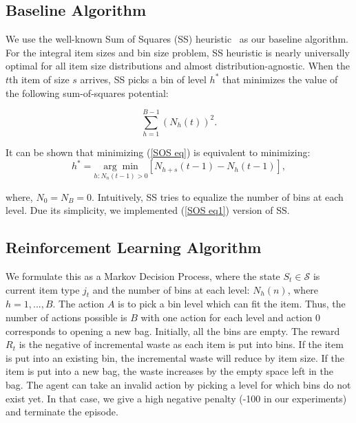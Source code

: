 \documentclass{article}
\begin{document}

\subsection{Baseline Algorithm}
We use the well-known Sum of Squares (SS) heuristic~\cite{csirik2006sum} as our baseline algorithm. For the integral item sizes and bin size problem, SS heuristic is nearly universally optimal for all item size distributions and almost distribution-agnostic. When the $t$th item of size $s$ arrives, SS picks a bin of level $h^*$ that minimizes the value of the following sum-of-squares potential:

\begin{equation}
\sum_{h=1}^{B-1} (N_{h}(t))^2. \label{SOS eq}
\end{equation}

\noindent It can be shown that minimizing (\ref{SOS eq}) is equivalent to minimizing:
\begin{equation}
h^* = \underset{h:N_n(t-1)>0}{\arg\min} [N_{h+s}(t-1) - N_h(t-1)], \label{SOS eq1}
\end{equation}

\noindent where, $N_0 = N_B = 0$. Intuitively, SS tries to equalize the number of bins at each level. Due its simplicity, we implemented (\ref{SOS eq1}) version of SS.

\subsection{Reinforcement Learning Algorithm}
We formulate this as a Markov Decision Process, where the state $S_t \in \mathcal{S}$ is current item type $j_t$ and the number of bins at each level: $N_h(n)$, where $h = 1,...,B$. The action $A$ is to pick a bin level which can fit the item.  Thus, the number of actions possible is $B$ with one action for each level and action 0 corresponds to opening a new bag. Initially, all the bins are empty. The reward $R_t$ is the negative of incremental waste as each item is put into bins. If the item is put into an existing bin, the incremental waste will reduce by item size. If the item is put into a new bag, the waste increases by the empty space left in the bag. The agent can take an invalid action by picking a level for which bins do not exist yet. In that case, we give a high negative penalty (-100 in our experiments) and terminate the episode. 
\end{document}
